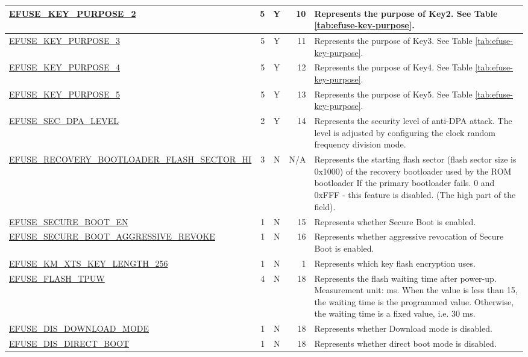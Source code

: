 \begin{longtable}[l]{ |m{8.2cm}|r|c|r|m{9cm}| }
    \hyperref[fielddesc:EFUSEKEYPURPOSE2]{EFUSE\_KEY\_PURPOSE\_2} & 5 & Y & 10 & Represents the purpose of Key2. See Table \ref{tab:efuse-key-purpose}. \\ \hline
    \hyperref[fielddesc:EFUSEKEYPURPOSE3]{EFUSE\_KEY\_PURPOSE\_3} & 5 & Y & 11 & Represents the purpose of Key3. See Table \ref{tab:efuse-key-purpose}. \\ \hline
    \hyperref[fielddesc:EFUSEKEYPURPOSE4]{EFUSE\_KEY\_PURPOSE\_4} & 5 & Y & 12 & Represents the purpose of Key4. See Table \ref{tab:efuse-key-purpose}. \\ \hline
    \hyperref[fielddesc:EFUSEKEYPURPOSE5]{EFUSE\_KEY\_PURPOSE\_5} & 5 & Y & 13 & Represents the purpose of Key5. See Table \ref{tab:efuse-key-purpose}. \\ \hline
    \hyperref[fielddesc:EFUSESECDPALEVEL]{EFUSE\_SEC\_DPA\_LEVEL} & 2 & Y & 14 & Represents the security level of anti-DPA attack. The level is adjusted by configuring the clock random frequency division mode. \\ \hline
    \hyperref[fielddesc:EFUSERECOVERYBOOTLOADERFLASHSECTORHI]{EFUSE\_RECOVERY\_BOOTLOADER\_FLASH\_SECTOR\_HI} & 3 & N & N/A & Represents the starting flash sector (flash sector size is 0x1000) of the recovery bootloader used by the ROM bootloader If the primary bootloader fails. 0 and 0xFFF - this feature is disabled. (The high part of the field). \\ \hline
    \hyperref[fielddesc:EFUSESECUREBOOTEN]{EFUSE\_SECURE\_BOOT\_EN} & 1 & N & 15 & Represents whether Secure Boot is enabled. \\ \hline
    \hyperref[fielddesc:EFUSESECUREBOOTAGGRESSIVEREVOKE]{EFUSE\_SECURE\_BOOT\_AGGRESSIVE\_REVOKE} & 1 & N & 16 & Represents whether aggressive revocation of Secure Boot is enabled. \\ \hline
    \hyperref[fielddesc:EFUSEKMXTSKEYLENGTH256]{EFUSE\_KM\_XTS\_KEY\_LENGTH\_256} & 1 & N & 1 & Represents which key flash encryption uses. \\ \hline
    \hyperref[fielddesc:EFUSEFLASHTPUW]{EFUSE\_FLASH\_TPUW} & 4 & N & 18 & Represents the flash waiting time after power-up. Measurement unit: ms. When the value is less than 15, the waiting time is the programmed value. Otherwise, the waiting time is a fixed value, i.e. 30 ms. \\ \hline
    \hyperref[fielddesc:EFUSEDISDOWNLOADMODE]{EFUSE\_DIS\_DOWNLOAD\_MODE} & 1 & N & 18 & Represents whether Download mode is disabled.\\ \hline
    \hyperref[fielddesc:EFUSEDISDIRECTBOOT]{EFUSE\_DIS\_DIRECT\_BOOT} & 1 & N & 18 & Represents whether direct boot mode is disabled. \\ \hline

\end{longtable}

